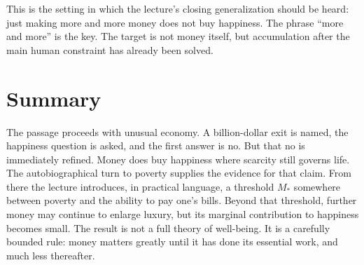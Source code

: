 This is the setting in which the lecture’s closing generalization should be heard: just making more and more money does not buy happiness. The phrase ``more and more'' is the key. The target is not money itself, but accumulation after the main human constraint has already been solved.

\section{Summary}

The passage proceeds with unusual economy. A billion-dollar exit is named, the happiness question is asked, and the first answer is no. But that no is immediately refined. Money does buy happiness where scarcity still governs life. The autobiographical turn to poverty supplies the evidence for that claim. From there the lecture introduces, in practical language, a threshold \(M_*\) somewhere between poverty and the ability to pay one’s bills. Beyond that threshold, further money may continue to enlarge luxury, but its marginal contribution to happiness becomes small. The result is not a full theory of well-being. It is a carefully bounded rule: money matters greatly until it has done its essential work, and much less thereafter.